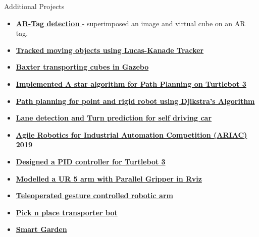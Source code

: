 \documentclass{resume} %
\begin{document}
\begin{rSection}{Additional Projects}
    \begin{itemize}[noitemsep]
        \item {\bf \href{https://github.com/kulbir-ahluwalia/ENPM_673_Perception}{AR-Tag detection }}- superimposed an image and virtual cube on an AR tag. 
        \item {\bf \href{https://github.com/kulbir-ahluwalia/Lucas_Kanade_Tracker}{Tracked moving objects using Lucas-Kanade Tracker}} 
        \item {\bf \href{https://github.com/kulbir-ahluwalia/Baxter_ROS_kinetic_transporting_cubes}{Baxter transporting cubes in Gazebo} } 
        \item {\bf \href{https://github.com/kulbir-ahluwalia/Implementing_A_star_on_Turtlebot3}{Implemented A star algorithm for Path Planning on Turtlebot 3}} 
        \item {\bf \href{https://github.com/kulbir-ahluwalia/Dijkstra_Project_2_ENPM_661}{Path planning for point and rigid robot using Djikstra's Algorithm}} 
        \item {\bf \href{https://github.com/kulbir-ahluwalia/ENPM_673_Perception}{Lane detection and Turn prediction for self driving car}} 
        \item {\bf \href{https://drive.google.com/drive/folders/1t-sGh60o9W79BdqMked3BNomsTYB6heL?usp=sharing }{Agile Robotics for Industrial Automation Competition (ARIAC) 2019}} 
        \item {\bf \href{https://github.com/kulbir-ahluwalia/Turtlebot_3_PID}{Designed a PID controller for Turtlebot 3}} 
        \item {\bf \href{https://github.com/kulbir-ahluwalia/662-Final-Project-UR-5-arm}{Modelled a UR 5 arm with Parallel Gripper in Rviz}} 
        \item {\bf \href{https://github.com/kulbir-ahluwalia/Gesture-controlled-mobile-robotic-arm}{Teleoperated gesture controlled robotic arm}} 
        \item {\bf \href{https://drive.google.com/drive/folders/1rdmeapw3x31Y8ErJVZA07-d7b3ryTlUZ?usp=sharing }{Pick n place transporter bot}} 
        \item {\bf \href{https://drive.google.com/drive/folders/1t-sGh60o9W79BdqMked3BNomsTYB6heL?usp=sharing }{Smart Garden}} 
    \end{itemize}
\end{rSection}
\end{document}
